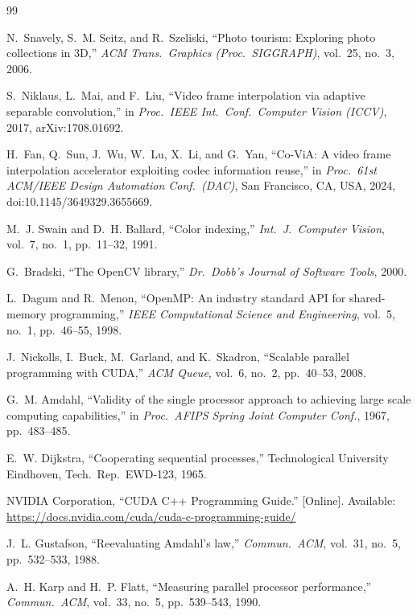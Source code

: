 \documentclass[conference]{IEEEtran}
\begin{document}
\begin{thebibliography}{99}

N.~Snavely, S.~M. Seitz, and R.~Szeliski, ``Photo tourism: Exploring photo collections in 3D,'' \emph{ACM Trans.\ Graphics (Proc.\ SIGGRAPH)}, vol.~25, no.~3, 2006.

S.~Niklaus, L.~Mai, and F.~Liu, ``Video frame interpolation via adaptive separable convolution,'' in \emph{Proc.\ IEEE Int.\ Conf.\ Computer Vision (ICCV)}, 2017, arXiv:1708.01692.

H.~Fan, Q.~Sun, J.~Wu, W.~Lu, X.~Li, and G.~Yan, ``Co-ViA: A video frame interpolation accelerator exploiting codec information reuse,'' in \emph{Proc.\ 61st ACM/IEEE Design Automation Conf.\ (DAC)}, San Francisco, CA, USA, 2024, doi:10.1145/3649329.3655669.

M.~J. Swain and D.~H. Ballard, ``Color indexing,'' \emph{Int.\ J.\ Computer Vision}, vol.~7, no.~1, pp.~11--32, 1991.

G.~Bradski, ``The OpenCV library,'' \emph{Dr.\ Dobb's Journal of Software Tools}, 2000.

L.~Dagum and R.~Menon, ``OpenMP: An industry standard API for shared-memory programming,'' \emph{IEEE Computational Science and Engineering}, vol.~5, no.~1, pp.~46--55, 1998.

J.~Nickolls, I.~Buck, M.~Garland, and K.~Skadron, ``Scalable parallel programming with CUDA,'' \emph{ACM Queue}, vol.~6, no.~2, pp.~40--53, 2008.

G.~M. Amdahl, ``Validity of the single processor approach to achieving large scale computing capabilities,'' in \emph{Proc.\ AFIPS Spring Joint Computer Conf.}, 1967, pp.~483--485.

E.~W. Dijkstra, ``Cooperating sequential processes,'' Technological University Eindhoven, Tech.\ Rep.\ EWD-123, 1965.

NVIDIA Corporation, ``CUDA C++ Programming Guide.'' [Online]. Available: \url{https://docs.nvidia.com/cuda/cuda-c-programming-guide/}

J.~L. Gustafson, ``Reevaluating Amdahl's law,'' \emph{Commun.\ ACM}, vol.~31, no.~5, pp.~532--533, 1988.

A.~H. Karp and H.~P. Flatt, ``Measuring parallel processor performance,'' \emph{Commun.\ ACM}, vol.~33, no.~5, pp.~539--543, 1990.


\end{thebibliography}
\end{document}

